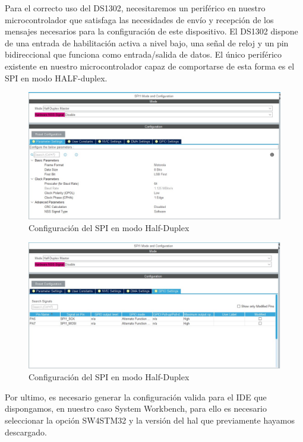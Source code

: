 \documentclass[10pt,a4paper,oneside]{article}
\begin{document}
Para el correcto uso del DS1302, necesitaremos un periférico en nuestro microcontrolador que satisfaga las necesidades de envío y recepción de los mensajes necesarios para la configuración de este dispositivo. El DS1302 dispone de una entrada de habilitación activa a nivel bajo, una señal de reloj y un pin bidireccional que funciona como entrada/salida de datos. El único periférico existente en nuestro microcontrolador capaz de comportarse de esta forma es el SPI en modo HALF-duplex.

\begin{figure}[H]
\centering
\includegraphics[scale=0.5]{Imagenes/Spi_cfg1.jpg}
\caption[Configuración del SPI en modo Half-Duplex]{Configuración del SPI en modo Half-Duplex}
\label{fig:011}
\end{figure}

\begin{figure}[H]
\centering
\includegraphics[scale=0.5]{Imagenes/Spi_cfg2.jpg}
\caption[Configuración del SPI en modo Half-Duplex]{Configuración del SPI en modo Half-Duplex}
\label{fig:012}
\end{figure}

Por ultimo, es necesario generar la configuración valida para el IDE que dispongamos, en nuestro caso System Workbench, para ello es necesario seleccionar la opción SW4STM32 y la versión del hal que previamente hayamos descargado.
\end{document}
